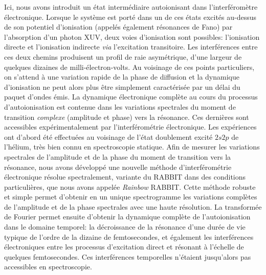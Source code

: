 Ici, nous avons introduit un état intermédiaire autoionisant dans l'interféromètre électronique. Lorsque le système est porté dans un de ces états excités au-dessus de son potentiel d'ionisation (appelés également résonances de Fano) par l'absorption d'un photon XUV, deux voies d'ionisation sont possibles: l'ionisation directe et l'ionisation indirecte \textit{via} l'excitation transitoire. Les interférences entre ces deux chemins produisent un profil de raie asymétrique, d'une largeur de quelques dizaines de milli-électron-volts. Au voisinage de ces points particuliers, on s'attend à une variation rapide de la phase de diffusion et la dynamique d'ionisation ne peut alors plus être simplement caractérisée par un délai du paquet d'ondes émis. La dynamique électronique complète au cours du processus d'autoionisation est contenue dans les variations spectrales du moment de transition \textit{complexe} (amplitude et phase) vers la résonance. Ces dernières sont accessibles expérimentalement par l'interférométrie électronique. Les expériences ont d'abord été effectuées au voisinage de l'état doublement excité $2s2p$ de l'hélium, très bien connu en spectroscopie statique. Afin de mesurer les variations spectrales de l'amplitude et de la phase du moment de transition vers la résonance, nous avons développé une nouvelle méthode d'interférométrie électronique résolue spectralement, variante du RABBIT dans des conditions particulières, que nous avons appelée  \textit{Rainbow} RABBIT. Cette méthode robuste et simple permet d'obtenir en un unique spectrogramme les variations complètes de l'amplitude et de la phase spectrales avec une haute résolution. La transformée de Fourier permet ensuite d'obtenir la dynamique complète de l'autoionisation dans le domaine temporel: la décroissance de la résonance d'une durée de vie typique de l'ordre de la dizaine de femtosecondes, et également les interférences électroniques entre les processus d'excitation direct et résonant à l'échelle de quelques femtosecondes. Ces interférences temporelles n'étaient jusqu'alors pas accessibles en spectroscopie.

